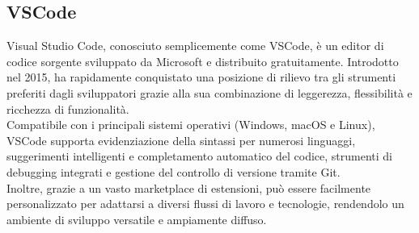\subsection{VSCode}
Visual Studio Code, conosciuto semplicemente come VSCode, è un editor di codice sorgente sviluppato da Microsoft e distribuito gratuitamente. Introdotto nel 2015, ha rapidamente conquistato una posizione di rilievo tra gli strumenti preferiti dagli sviluppatori grazie alla sua combinazione di leggerezza, flessibilità e ricchezza di funzionalità. \\Compatibile con i principali sistemi operativi (Windows, macOS e Linux), VSCode supporta evidenziazione della sintassi per numerosi linguaggi, suggerimenti intelligenti e completamento automatico del codice, strumenti di debugging integrati e gestione del controllo di versione tramite Git. \\Inoltre, grazie a un vasto marketplace di estensioni, può essere facilmente personalizzato per adattarsi a diversi flussi di lavoro e tecnologie, rendendolo un ambiente di sviluppo versatile e ampiamente diffuso.

\newpage